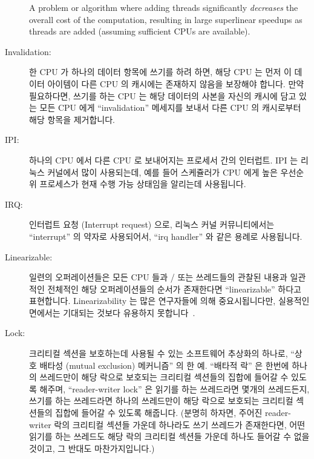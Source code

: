 \begin{description}
	A problem or algorithm where adding threads significantly
	\emph{decreases} the overall cost of the computation, resulting in
	large superlinear speedups as threads are added (assuming sufficient
	CPUs are available).
	\fi
\item[Invalidation:]
	한 CPU 가 하나의 데이터 항목에 쓰기를 하려 하면, 해당 CPU 는 먼저 이
	데이터 아이템이 다른 CPU 의 캐시에는 존재하지 않음을 보장해야 합니다.
	만약 필요하다면, 쓰기를 하는 CPU 는 해당 데이터의 사본을 자신의 캐시에
	담고 있는 모든 CPU 에게 ``invalidation'' 메세지를 보내서 다른 CPU 의
	캐시로부터 해당 항목을 제거합니다.
	\iffalse

	When a CPU wishes to write to a data item, it must first ensure
	that this data item is not present in any other CPUs' cache.
	If necessary, the item is removed from the other CPUs' caches
	via ``invalidation'' messages from the writing CPUs to any
	CPUs having a copy in their caches.
	\fi
\item[IPI:]
	하나의 CPU 에서 다른 CPU 로 보내어지는 프로세서 간의 인터럽트.
	IPI 는 리눅스 커널에서 많이 사용되는데, 예를 들어 스케쥴러가 CPU 에게
	높은 우선순위 프로세스가 현재 수행 가능 상태임을 알리는데 사용됩니다.
	\iffalse

	Inter-processor interrupt, which is an
	interrupt sent from one CPU to another.
	IPIs are used heavily in the Linux kernel, for example, within
	the scheduler to alert CPUs that a high-priority process is now
	runnable.
	\fi
\item[IRQ:]
	인터럽트 요청 (Interrupt request) 으로, 리눅스 커널 커뮤니티에서는
	``interrupt'' 의 약자로 사용되어서, ``irq handler'' 와 같은 용례로
	사용됩니다.
	\iffalse

	Interrupt request, often used as an abbreviation for ``interrupt''
	within the Linux kernel community, as in ``irq handler''.
	\fi
\item[Linearizable:]
	일련의 오퍼레이션들은 모든 CPU 들과 / 또는 쓰레드들의 관찰된 내용과
	일관적인 전체적인 해당 오퍼레이션들의 순서가 존재한다면
	``linearizable'' 하다고 표현합니다.
	Linearizability 는 많은 연구자들에 의해 중요시됩니다만, 실용적인
	면에서는 기대되는 것보다 유용하지
	못합니다~\cite{AndreasHaas2012FIFOisnt}.
	\iffalse

	A sequence of operations is ``linearizable'' if there is at
	least one global ordering of the sequence that is consistent
	with the observations of all CPUs and/or threads.
	Linearizability is much prized by many researchers, but less
	useful in practice than one might
	expect~\cite{AndreasHaas2012FIFOisnt}.
	\fi
\item[Lock:]
	크리티컬 섹션을 보호하는데 사용될 수 있는 소프트웨어 추상화의 하나로, 
	``상호 배타성 (mutual exclusion) 메커니즘'' 의 한 예.
	``배타적 락'' 은 한번에 하나의 쓰레드만이 해당 락으로 보호되는 크리티컬
	섹션들의 집합에 들어갈 수 있도록 해주며, ``reader-writer lock'' 은
	읽기를 하는 쓰레드라면 몇개의 쓰레드든지, 쓰기를 하는 쓰레드라면 하나의
	쓰레드만이 해당 락으로 보호되는 크리티컬 섹션들의 집합에 들어갈 수
	있도록 해줍니다.  (분명히 하자면, 주어진 reader-writer 락의 크리티컬
	섹션들 가운데 하나라도 쓰기 쓰레드가 존재한다면, 어떤 읽기를 하는
	쓰레드도 해당 락의 크리티컬 섹션들 가운데 하나도 들어갈 수 없을 것이고,
	그 반대도 마찬가지입니다.)
	\iffalse


\end{description}
